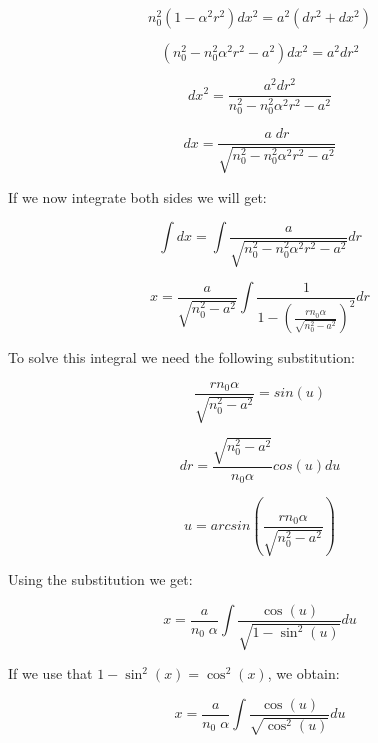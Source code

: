 \documentclass{article}
\begin{document}
\begin{equation}
	n_0^2 (1 - \alpha ^2 r^2)  dx^2 = a^2 (dr^2 + dx^2)
\end{equation}

\begin{equation}
	(n_0 ^2 - n_0^2 \alpha ^2 r^2 - a^2)  dx^2 = a^2 dr^2
\end{equation}

\begin{equation}
	dx^2 =\frac{a^2 dr^2}{n_0 ^2 - n_0^2 \alpha ^2 r^2 - a^2}
\end{equation}

\begin{equation}
	dx =\frac{a \; dr}{\sqrt{n_0 ^2 - n_0^2 \alpha ^2 r^2 - a^2}}
	\label{eq:drdx}
\end{equation}

If we now integrate both sides we will get:

\begin{equation}
	\int dx = \int \frac{a}{\sqrt{n_0 ^2 - n_0^2 \alpha ^2 r^2 - a^2}} dr
\end{equation}

\begin{equation}
	x = \frac{a}{\sqrt{n_0^2 - a^2}} \int \frac{1}{1 - \left( \frac{r n_0 \alpha}{\sqrt{n_0^2-a^2}} \right) ^2} dr
\end{equation}

To solve this integral we need the following substitution:

\begin{equation}
	 \frac{r n_0 \alpha}{\sqrt{n_0^2-a^2}} = sin(u)
\end{equation}

\begin{equation}
	 dr = \frac{\sqrt{n_0^2-a^2}}{n_0 \alpha} cos(u) du
\end{equation}

\begin{equation}
	 u = arcsin \left( \frac{r n_0 \alpha}{\sqrt{n_0^2-a^2}} \right)
\end{equation}

Using the substitution we get:

\begin{equation}
	x = \frac{a}{n_0 \; \alpha} \int \frac{\cos (u)}{\sqrt{1 - \sin^2 (u)}} du
\end{equation}

If we use that $1 - \sin^2 (x) = \cos^2 (x)$, we obtain:

\begin{equation}
	x = \frac{a}{n_0 \; \alpha} \int \frac{\cos (u)}{\sqrt{\cos^2 (u)}} du
\end{equation}
\end{document}
